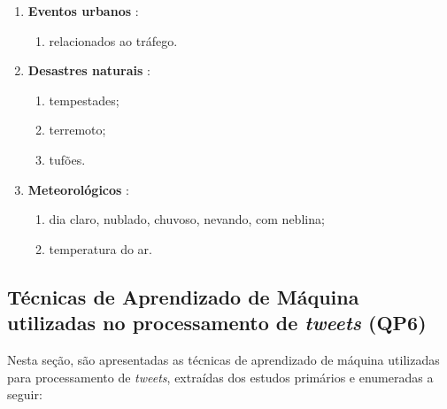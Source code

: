 \documentclass[
	12pt,				%
	oneside,			%
	a4paper,			%
	english,			%
	brazil				%
	]{abntex2ppgsi}
\begin{document}
{{\begin{enumerate}
\item \textbf{Eventos urbanos} \cite{Chen2016, Lecue2014}:
\begin{enumerate}
\item relacionados ao tráfego.
\end{enumerate}

\item \textbf{Desastres naturais} \cite{Itoh2016}:
\begin{enumerate}
\item tempestades;
\item terremoto;
\item tufões.
\end{enumerate}

\item \textbf{Meteorológicos} \cite{Chen2016}:
\begin{enumerate}
\item dia claro, nublado, chuvoso, nevando, com neblina;
\item temperatura do ar.
\end{enumerate}

\end{enumerate}

\subsection{Técnicas de Aprendizado de Máquina utilizadas no processamento de \textit{tweets} (QP6)}
\label{iaClassification}
Nesta seção, são apresentadas as técnicas de aprendizado de máquina utilizadas para processamento de \textit{tweets}, extraídas dos estudos primários e enumeradas a seguir:

}}
\end{document}
